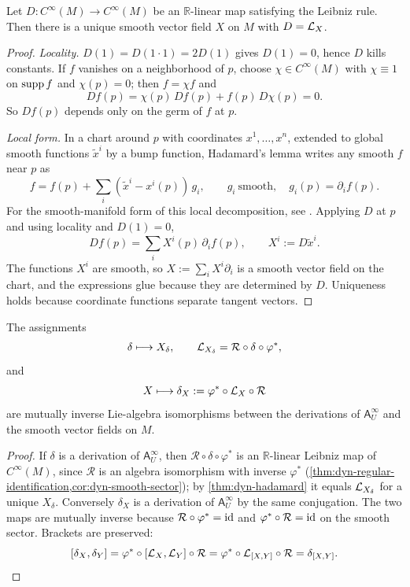 \begin{theorem}
	\label{thm:dyn-hadamard}
	Let \(D:C^\infty(M)\to C^\infty(M)\) be an \(\mathbb R\)-linear map
	satisfying the Leibniz rule. Then there is a unique smooth vector
	field \(X\) on \(M\) with \(D=\mathcal L_X\).
\end{theorem}
\begin{proof}
	\emph{Locality.} \(D(1)=D(1\cdot1)=2D(1)\) gives \(D(1)=0\), hence
	\(D\) kills constants. If \(f\) vanishes on a neighborhood of
	\(p\), choose \(\chi\in C^\infty(M)\) with \(\chi\equiv1\) on
	\(\operatorname{supp} f\) and \(\chi(p)=0\); then \(f=\chi f\) and
	\[
		Df(p)=\chi(p)\,Df(p)+f(p)\,D\chi(p)=0 .
	\]
	So \(Df(p)\) depends only on the germ of \(f\) at \(p\).

	\emph{Local form.} In a chart around \(p\) with coordinates
	\(x^1,\dots,x^n\), extended to global smooth functions
	\(\widetilde x^i\) by a bump function, Hadamard's lemma writes any
	smooth \(f\) near \(p\) as
	\[
		f=f(p)+\sum_i(\widetilde x^i-x^i(p))\,g_i,
		\qquad
		g_i\ \text{smooth},\quad g_i(p)=\partial_if(p).
	\]
	For the smooth-manifold form of this local decomposition, see
	\cite{Lee2013}.
	Applying \(D\) at \(p\) and using locality and \(D(1)=0\),
	\[
		Df(p)=\sum_i X^i(p)\,\partial_if(p),
		\qquad
		X^i:=D\widetilde x^i .
	\]
	The functions \(X^i\) are smooth, so \(X:=\sum_iX^i\partial_i\) is
	a smooth vector field on the chart, and the expressions glue
	because they are determined by \(D\). Uniqueness holds because
	coordinate functions separate tangent vectors.
\end{proof}

\begin{theorem}
	\label{thm:dyn-derivation-transport}
	The assignments
	\[
		\delta\longmapsto X_\delta,
		\qquad
		\mathcal L_{X_\delta}=\mathcal R\circ\delta\circ\varphi^*,
	\]
	and
	\[
		X\longmapsto\delta_X:=\varphi^*\circ\mathcal L_X\circ\mathcal R
	\]
	are mutually inverse Lie-algebra isomorphisms between the
	derivations of \(\mathsf A_U^\infty\) and the smooth vector fields
	on \(M\).
\end{theorem}
\begin{proof}
	If \(\delta\) is a derivation of \(\mathsf A_U^\infty\), then
	\(\mathcal R\circ\delta\circ\varphi^*\) is an \(\mathbb R\)-linear
	Leibniz map of \(C^\infty(M)\), since \(\mathcal R\) is an algebra
	isomorphism with inverse \(\varphi^*\)
	(\cref{thm:dyn-regular-identification,cor:dyn-smooth-sector});
	by \cref{thm:dyn-hadamard} it equals \(\mathcal L_{X_\delta}\) for a
	unique \(X_\delta\). Conversely \(\delta_X\) is a derivation of
	\(\mathsf A_U^\infty\) by the same conjugation. The two maps are
	mutually inverse because
	\(\mathcal R\circ\varphi^*=\operatorname{id}\) and
	\(\varphi^*\circ\mathcal R=\operatorname{id}\) on the smooth sector. Brackets
	are preserved:
	\[
		[\delta_X,\delta_Y]
		=
		\varphi^*\circ[\mathcal L_X,\mathcal L_Y]\circ\mathcal R
		=
		\varphi^*\circ\mathcal L_{[X,Y]}\circ\mathcal R
		=
		\delta_{[X,Y]} .
	\]
\end{proof}

